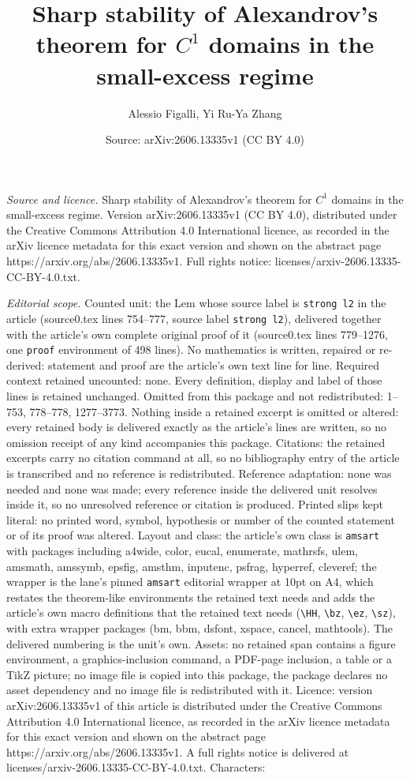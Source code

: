 \documentclass[10pt,a4paper]{amsart}
\title[Sharp stability of Alexandrov's theorem for $C^1$ domains in]{Sharp stability of Alexandrov's theorem for $C^1$ domains in the small-excess regime}
\author{Alessio Figalli, Yi Ru-Ya Zhang}
\date{Source: arXiv:2606.13335v1 (CC BY 4.0)}
\begin{document}
\maketitle

\noindent\emph{Source and licence.} Sharp stability of Alexandrov's theorem for $C^1$ domains in the small-excess regime. Version arXiv:2606.13335v1 (CC BY 4.0), distributed under the Creative Commons Attribution 4.0 International licence, as recorded in the arXiv licence metadata for this exact version and shown on the abstract page https://arxiv.org/abs/2606.13335v1. Full rights notice: licenses/arxiv-2606.13335-CC-BY-4.0.txt.\par\smallskip

\noindent\textit{Editorial scope.} Counted unit: the Lem whose source label is \texttt{strong l2} in the article (source0.tex lines 754--777, source label \texttt{strong l2}), delivered together with the article's own complete original proof of it (source0.tex lines 779--1276, one \texttt{proof} environment of 498 lines). No mathematics is written, repaired or re-derived: statement and proof are the article's own text line for line. Required context retained uncounted: none. Every definition, display and label of those lines is retained unchanged. Omitted from this package and not redistributed: 1--753, 778--778, 1277--3773. Nothing inside a retained excerpt is omitted or altered: every retained body is delivered exactly as the article's lines are written, so no omission receipt of any kind accompanies this package. Citations: the retained excerpts carry no citation command at all, so no bibliography entry of the article is transcribed and no reference is redistributed. Reference adaptation: none was needed and none was made; every reference inside the delivered unit resolves inside it, so no unresolved reference or citation is produced. Printed slips kept literal: no printed word, symbol, hypothesis or number of the counted statement or of its proof was altered. Layout and class: the article's own class is \texttt{amsart} with packages including a4wide, color, eucal, enumerate, mathrsfs, ulem, amsmath, amssymb, epsfig, amsthm, inputenc, psfrag, hyperref, cleveref; the wrapper is the lane's pinned \texttt{amsart} editorial wrapper at 10pt on A4, which restates the theorem-like environments the retained text needs and adds the article's own macro definitions that the retained text needs (\texttt{\textbackslash HH}, \texttt{\textbackslash bz}, \texttt{\textbackslash ez}, \texttt{\textbackslash sz}), with extra wrapper packages (bm, bbm, dsfont, xspace, cancel, mathtools). The delivered numbering is the unit's own. Assets: no retained span contains a figure environment, a graphics-inclusion command, a PDF-page inclusion, a table or a TikZ picture; no image file is copied into this package, the package declares no asset dependency and no image file is redistributed with it. Licence: version arXiv:2606.13335v1 of this article is distributed under the Creative Commons Attribution 4.0 International licence, as recorded in the arXiv licence metadata for this exact version and shown on the abstract page https://arxiv.org/abs/2606.13335v1. A full rights notice is delivered at licenses/arxiv-2606.13335-CC-BY-4.0.txt. Characters: 
\end{document}

